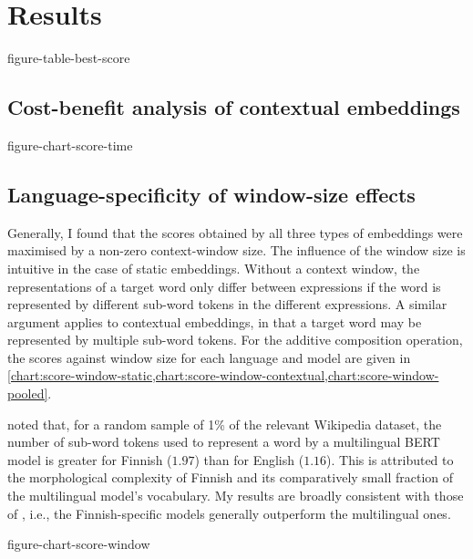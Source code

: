 \section{Results}
\label{sec:results}

{figure-table-best-score}

\subsection{Cost-benefit analysis of contextual embeddings}
\label{sec:cost-benefit}

{figure-chart-score-time}


\subsection{Language-specificity of window-size effects}

Generally, I found that the scores obtained by all three types of embeddings were
maximised by a non-zero context-window size.
The influence of the window size is intuitive in the case of static embeddings.
Without a context window, the representations of a target word only differ between
expressions if the word is represented by different sub-word tokens in the different
expressions.
A similar argument applies to contextual embeddings, in that a target word may be
represented by multiple sub-word tokens.
For the additive composition operation, the scores against window size for each
language and model are given in
\cref{chart:score-window-static,chart:score-window-contextual,chart:score-window-pooled}.

\textcite[3]{Virtanen2019} noted that, for a random sample of 1\% of the relevant
Wikipedia dataset, the number of sub-word tokens used to represent a word by a
multilingual BERT model is greater for Finnish ($1.97$) than for English ($1.16$).
This is attributed to the morphological complexity of Finnish and its comparatively
small fraction of the multilingual model's vocabulary.
My results are broadly consistent with those of \citeauthor{Virtanen2019}, i.e., the
Finnish-specific models generally outperform the multilingual ones.

{figure-chart-score-window}